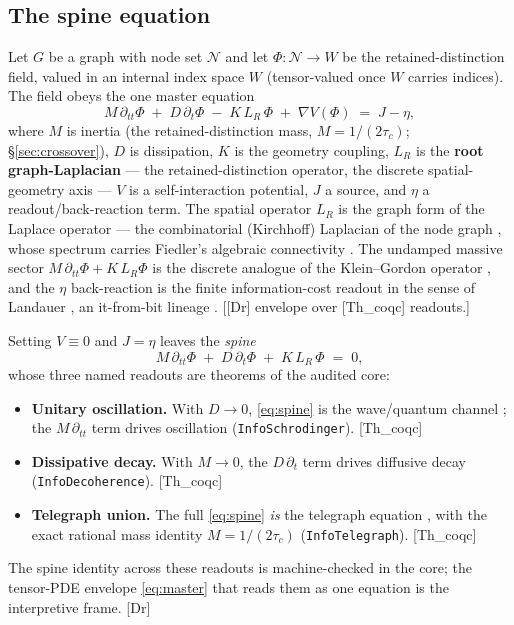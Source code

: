 \documentclass[10pt,twocolumn]{article}
\theoremstyle{definition}
\newcommand{\Thq}{\textsf{[Th\_coqc]}}
\newcommand{\Dr}{\textsf{[Dr]}}
\newcommand{\code}[1]{\texttt{#1}}
\newcommand{\LR}{L_{R}}
\begin{document}
\subsection{The spine equation}\label{sec:spine-eq}

Let $G$ be a graph with node set $\mathcal{N}$ and let $\Phi:\mathcal{N}\to W$ be the
retained-distinction field, valued in an internal index space $W$ (tensor-valued once $W$
carries indices). The field obeys the one master equation
\begin{equation}\label{eq:master}
M\,\partial_{tt}\Phi \;+\; D\,\partial_{t}\Phi \;-\; K\,\LR\,\Phi \;+\; \nabla V(\Phi)
\;=\; J-\eta ,
\end{equation}
where $M$ is inertia (the retained-distinction mass, $M=1/(2\tau_c)$; \S\ref{sec:crossover}),
$D$ is dissipation, $K$ is the geometry coupling, $\LR$ is the \textbf{root graph-Laplacian}
--- the retained-distinction operator, the discrete spatial-geometry axis --- $V$ is a
self-interaction potential, $J$ a source, and $\eta$ a readout/back-reaction term. The
spatial operator $\LR$ is the graph form of the Laplace operator \cite{laplace1799} --- the
combinatorial (Kirchhoff) Laplacian of the node graph \cite{kirchhoff1847}, whose spectrum
carries Fiedler's algebraic connectivity \cite{fiedler1973}. The undamped massive sector
$M\,\partial_{tt}\Phi + K\,\LR\Phi$ is the discrete analogue of the Klein--Gordon operator
\cite{klein1926,gordon1926}, and the $\eta$ back-reaction is the finite information-cost
readout in the sense of Landauer \cite{landauer1961}, an it-from-bit lineage
\cite{wheeler1990}.
[\Dr{} envelope over \Thq{} readouts.]

Setting $V\equiv 0$ and $J=\eta$ leaves the \emph{spine}
\begin{equation}\label{eq:spine}
M\,\partial_{tt}\Phi \;+\; D\,\partial_{t}\Phi \;+\; K\,\LR\,\Phi \;=\; 0 ,
\end{equation}
whose three named readouts are theorems of the audited core:
\begin{itemize}\itemsep2pt
\item[] \textbf{Unitary oscillation.} With $D\to 0$, \eqref{eq:spine} is the wave/quantum
  channel \cite{schrodinger1926}; the $M\,\partial_{tt}$ term drives oscillation
  (\code{InfoSchrodinger}). \Thq{}
\item[] \textbf{Dissipative decay.} With $M\to 0$, the $D\,\partial_{t}$ term drives
  diffusive decay (\code{InfoDecoherence}). \Thq{}
\item[] \textbf{Telegraph union.} The full \eqref{eq:spine} \emph{is} the telegraph
  equation \cite{thomson1855,heaviside1893}, with the exact rational mass identity
  $M=1/(2\tau_c)$ (\code{InfoTelegraph}). \Thq{}
\end{itemize}
The spine identity across these readouts is machine-checked in the core; the tensor-PDE
envelope \eqref{eq:master} that reads them as one equation is the interpretive frame. \Dr{}
\end{document}

